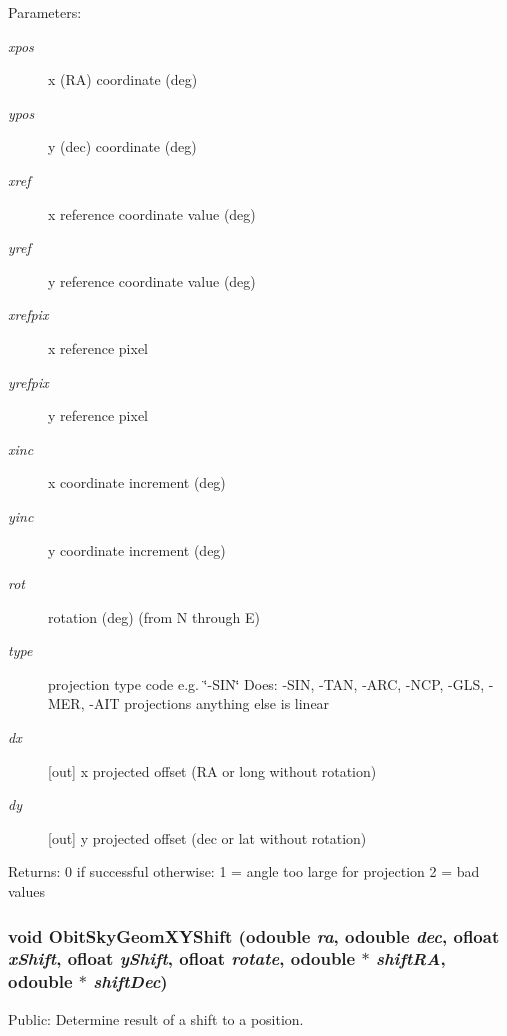 \begin{Desc}
\item[Parameters:]
\begin{description}
\item[{\em xpos}]x (RA) coordinate (deg) \item[{\em ypos}]y (dec) coordinate (deg) \item[{\em xref}]x reference coordinate value (deg) \item[{\em yref}]y reference coordinate value (deg) \item[{\em xrefpix}]x reference pixel \item[{\em yrefpix}]y reference pixel \item[{\em xinc}]x coordinate increment (deg) \item[{\em yinc}]y coordinate increment (deg) \item[{\em rot}]rotation (deg) (from N through E) \item[{\em type}]projection type code e.g. \char`\"{}-SIN\char`\"{} Does: -SIN, -TAN, -ARC, -NCP, -GLS, -MER, -AIT projections anything else is linear \item[{\em dx}][out] x projected offset (RA or long without rotation) \item[{\em dy}][out] y projected offset (dec or lat without rotation) \end{description}
\end{Desc}
\begin{Desc}
\item[Returns:]0 if successful otherwise: 1 = angle too large for projection 2 = bad values \end{Desc}
\subsubsection{\setlength{\rightskip}{0pt plus 5cm}void Obit\-Sky\-Geom\-XYShift ({\bf odouble} {\em ra}, {\bf odouble} {\em dec}, {\bf ofloat} {\em x\-Shift}, {\bf ofloat} {\em y\-Shift}, {\bf ofloat} {\em rotate}, {\bf odouble} $\ast$ {\em shift\-RA}, {\bf odouble} $\ast$ {\em shift\-Dec})}\label{ObitSkyGeom_8h_a9}


Public: Determine result of a shift to a position. 

